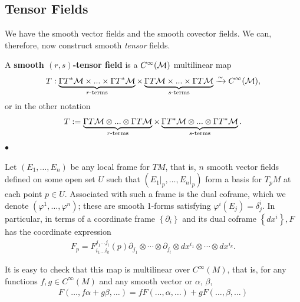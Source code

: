 \documentclass[12pt]{article} %
\begin{document}
\subsection{Tensor Fields}

We have the smooth vector fields and the smooth covector fields. We can, therefore, now construct smooth \textit{tensor} fields. 

    A \textbf{smooth $(r,s)$-tensor field} is a $C^{\infty}(\mathcal{M})$ multilinear map 
    \begin{align*}
        T : \underbrace{\Gamma T^*\mathcal{M} \times ... \times \Gamma T^*\mathcal{M}}_{r\text{-terms}} \times \underbrace{\Gamma T\mathcal{M} \times ... \times \Gamma T\mathcal{M}}_{s{\text{-terms}}} \xrightarrow{\sim} C^{\infty}(\mathcal{M}),
    \end{align*}
    or in the other notation 
    \begin{align*}
        T := \underbrace{\Gamma T\mathcal{M} \otimes ... \otimes \Gamma T\mathcal{M}}_{r\text{-terms}} \times \underbrace{\Gamma T^*\mathcal{M} \otimes ... \otimes \Gamma T^*\mathcal{M}}_{s{\text{-terms}}}.
    \end{align*}
\ed 
$\bullet$ 

Let $\left(E_{1}, \ldots, E_{n}\right)$ be any local frame for $T M$, that is, $n$ smooth vector fields defined on some open set $U$ such that $\left(\left.E_{1}\right|_{p}, \ldots,\left.E_{n}\right|_{p}\right)$ form a basis for $T_{p} M$ at each point $p \in U$. Associated with such a frame is the dual coframe, which we denote $\left(\varphi^{1}, \ldots, \varphi^{n}\right)$; these are smooth 1-forms satisfying $\varphi^{i}\left(E_{j}\right)=\delta_{j}^{i}$.  In particular, in terms of a coordinate frame $\left\{\partial_{i}\right\}$ and its dual coframe $\left\{d x^{i}\right\}, F$ has the coordinate expression
\begin{align*}
F_{p}=F_{i_{1} \ldots i_{k}}^{j_{1} \ldots j_{l}}(p) \partial_{j_{1}} \otimes \cdots \otimes \partial_{j_{l}} \otimes d x^{i_{1}} \otimes \cdots \otimes d x^{i_{k}} .
\end{align*}
\begin{lema}
It is easy to check that this map is multilinear over $C^{\infty}(M)$, that is, for any functions $f, g \in C^{\infty}(M)$ and any smooth vector or  $\alpha$, $\beta$,
\begin{align*}
F(\ldots, f \alpha+g \beta, \ldots)=f F(\ldots, \alpha, \ldots)+g F(\ldots, \beta, \ldots)
\end{align*}
\end{lema}
\end{document}
